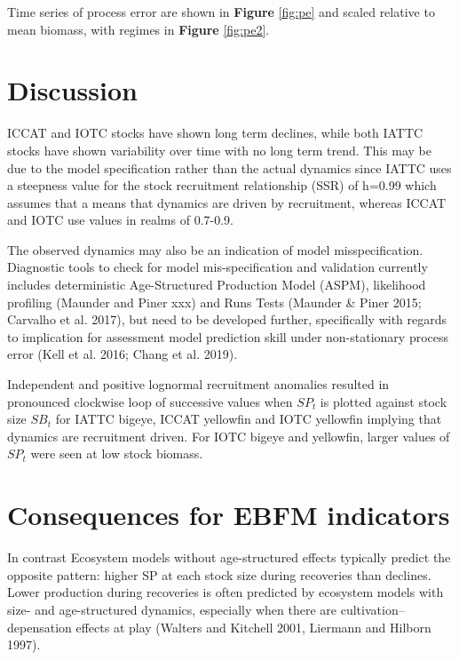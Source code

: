 \documentclass[12pt,doublespacing,a4paper]{ouparticle}
\begin{document}
Time series of process error are shown in \textbf{Figure} \ref{fig:pe} and scaled relative to mean biomass, with regimes in \textbf{Figure} \ref{fig:pe2}. 

\section{Discussion}

ICCAT and IOTC stocks have shown long term declines, while both IATTC stocks have shown variability over time with no long term trend. This may be due to the model specification rather than the actual dynamics since IATTC uses a steepness value for the stock recruitment relationship (SSR) of h=0.99 which assumes that a means that dynamics are driven by recruitment, whereas ICCAT and IOTC use values in realms of 0.7-0.9.

The observed dynamics may also be an indication of model misspecification. Diagnostic tools to check for model mis-specification and validation currently includes  deterministic Age-Structured Production Model (ASPM), likelihood profiling (Maunder and Piner xxx) and Runs Tests (Maunder & Piner 2015; Carvalho et al. 2017), but need to be developed further, specifically with regards to implication for assessment model prediction skill under non-stationary process error (Kell et al. 2016; Chang et al. 2019).

Independent and positive lognormal recruitment anomalies resulted in pronounced clockwise loop of successive values when $SP_t$ is plotted against stock size $SB_t$ for IATTC bigeye, ICCAT yellowfin and IOTC yellowfin implying that dynamics are recruitment driven. For IOTC bigeye and yellowfin, larger values of $SP_t$ were seen at low stock biomass. 

 

\section{Consequences for EBFM indicators}

In contrast Ecosystem models without age-structured effects typically predict the opposite pattern: higher SP at each stock size during recoveries than declines. Lower production during recoveries is often predicted by ecosystem models with size- and age-structured dynamics, especially when there are cultivation–depensation effects at play (Walters and Kitchell 2001, Liermann and Hilborn 1997). 
\end{document}
